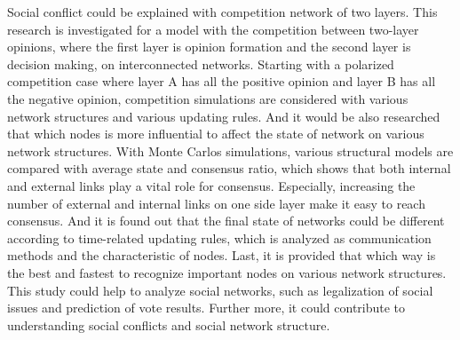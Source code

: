 

\begin{englishabstract}
Social conflict could be explained with competition network of two layers. This research is investigated for a model with the competition between two-layer opinions, where the first layer is opinion formation and the second layer is decision making, on interconnected networks. Starting with a polarized competition case where layer A has all the positive opinion and layer B has all the negative opinion, competition simulations are considered with various network structures and various updating rules. And it would be also researched that which nodes is more influential to affect the state of network on various network structures. With Monte Carlos simulations, various structural models are compared with average state and consensus ratio, which shows that both internal and external links play a vital role for consensus. Especially, increasing the number of external and internal links on one side layer make it easy to reach consensus. And it is found out that the final state of networks could be different according to time-related updating rules, which is analyzed as communication methods and the characteristic of nodes. Last, it is provided that which way is the best and fastest to recognize important nodes on various network structures. This study could help to analyze social networks, such as legalization of social issues and prediction of vote results. Further more, it could contribute to understanding social conflicts and social network structure.
\end{englishabstract}

